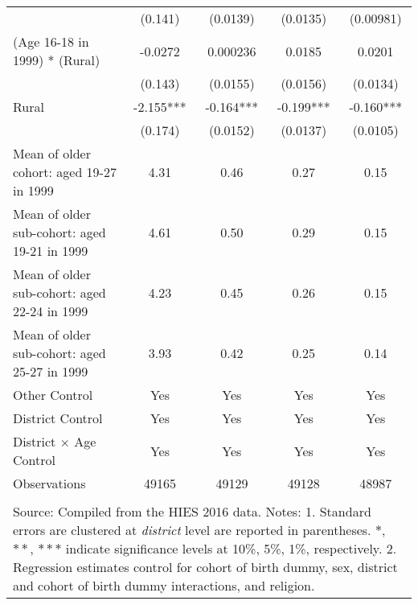 \begin{table}[h!]
\begin{center}
{{\begin{tabular}{lcccc}
	&(0.141)	&(0.0139)	&(0.0135)	&(0.00981)\\[1em]
(Age 16-18 in 1999) * (Rural)	&-0.0272	&0.000236	&0.0185	&0.0201\\
	&(0.143)	&(0.0155)	&(0.0156)	&(0.0134)\\[1em]
Rural	&-2.155***	&-0.164***	&-0.199***	&-0.160***\\
	&(0.174)	&(0.0152)	&(0.0137)	&(0.0105)\\
\hline
Mean of older cohort: aged 19-27 in 1999	&4.31	&0.46	&0.27	&  0.15\\
Mean of older sub-cohort: aged 19-21 in 1999	&4.61	&0.50	&0.29	&  0.15\\
Mean of older sub-cohort: aged 22-24 in 1999	&4.23	&0.45	&0.26	&  0.15\\
Mean of older sub-cohort: aged 25-27 in 1999	&3.93	&0.42	&0.25	&  0.14\\
Other Control	&Yes	&  Yes	&Yes	&Yes\\
District Control	&Yes	&  Yes	&Yes	&Yes\\
District $\times$ \textnormal{Age Control}	&Yes	&  Yes	&Yes	&Yes\\
Observations	&49165	&49129	&49128	&48987\\
\hline
\hline\\
\multicolumn{5}{p{15cm}}{{\footnotesize 	Source: 
Compiled from the HIES 2016 data.
	Notes: 1. 
Standard errors are clustered at \textit{district} level are reported in parentheses. 
$*$, $**$, $***$ indicate significance levels at 10\%, 5\%, 1\%, respectively.
	2. 
Regression estimates control for cohort of birth dummy, sex, 
district and cohort of birth dummy interactions, and religion.}}.
\end{tabular}
}
}
\end{center}
\end{table}
